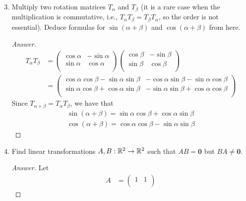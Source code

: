 \documentclass[../psets.tex]{subfiles}
\begin{document}
\begin{enumerate}[label={\textbf{5.\arabic*.}}]
    \setcounter{enumi}{2}
    \item Multiply two rotation matrices $T_\alpha$ and $T_\beta$ (it is a rare case when the multiplication is commutative, i.e., $T_\alpha T_\beta=T_\beta T_\alpha$, so the order is not essential). Deduce formulas for $\sin(\alpha+\beta)$ and $\cos(\alpha+\beta)$ from here.
    \begin{proof}[Answer]
        \begin{align*}
            T_\alpha T_\beta &=
            \begin{pmatrix}
                \cos\alpha & -\sin\alpha\\
                \sin\alpha & \cos\alpha\\
            \end{pmatrix}
            \begin{pmatrix}
                \cos\beta & -\sin\beta\\
                \sin\beta & \cos\beta\\
            \end{pmatrix}\\
            &=
            \begin{pmatrix}
                \cos\alpha\cos\beta-\sin\alpha\sin\beta & -\cos\alpha\sin\beta-\sin\alpha\cos\beta\\
                \sin\alpha\cos\beta+\cos\alpha\sin\beta & -\sin\alpha\sin\beta+\cos\alpha\cos\beta\\
            \end{pmatrix}
        \end{align*}
        Since $T_{\alpha+\beta}=T_\alpha T_\beta$, we have that
        \begin{gather*}
            \sin(\alpha+\beta) = \sin\alpha\cos\beta+\cos\alpha\sin\beta\\
            \cos(\alpha+\beta) = \cos\alpha\cos\beta-\sin\alpha\sin\beta
        \end{gather*}
    \end{proof}
    \setcounter{enumi}{4}
    \item Find linear transformations $A,B:\mathbb{R}^2\to\mathbb{R}^2$ such that $AB=\bm{0}$ but $BA\neq\bm{0}$.
    \begin{proof}[Answer]
        Let
        \begin{align*}
            A &=
            \begin{pmatrix}
                1 & 1\\

\end{pmatrix}
\end{align*}
\end{proof}
\end{enumerate}
\end{document}
